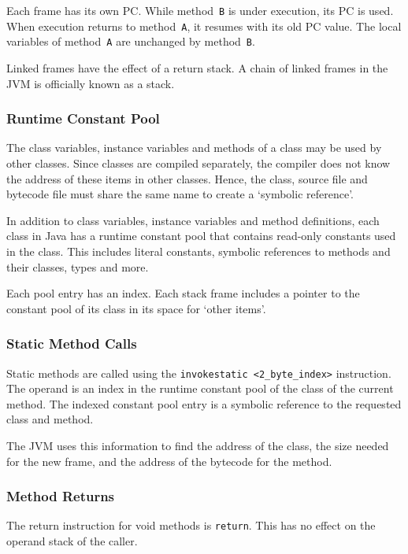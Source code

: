 Each frame has its own PC.\@
While method~\texttt{B} is under execution, its PC is used.
When execution returns to method~\texttt{A}, it resumes with its old PC value.
The local variables of method~\texttt{A} are unchanged by method~\texttt{B}.

Linked frames have the effect of a return stack.
A chain of linked frames in the JVM is officially known as a stack.

\subsubsection{Runtime Constant Pool}

The class variables, instance variables and methods of a class may be used by other classes.
Since classes are compiled separately, the compiler does not know the address of these items in other classes.
Hence, the class, source file and bytecode file must share the same name to create a `symbolic reference'.

In addition to class variables, instance variables and method definitions, each class in Java has a runtime constant pool that contains read-only constants used in the class.
This includes literal constants, symbolic references to methods and their classes, types and more.

Each pool entry has an index.
Each stack frame includes a pointer to the constant pool of its class in its space for `other items'.

\subsubsection{Static Method Calls}

Static methods are called using the \texttt{invokestatic <2\_byte\_index>} instruction.
The operand is an index in the runtime constant pool of the class of the current method.
The indexed constant pool entry is a symbolic reference to the requested class and method.

The JVM uses this information to find the address of the class, the size needed for the new frame, and the address of the bytecode for the method.

\subsubsection{Method Returns}

The return instruction for void methods is \texttt{return}.
This has no effect on the operand stack of the caller.

